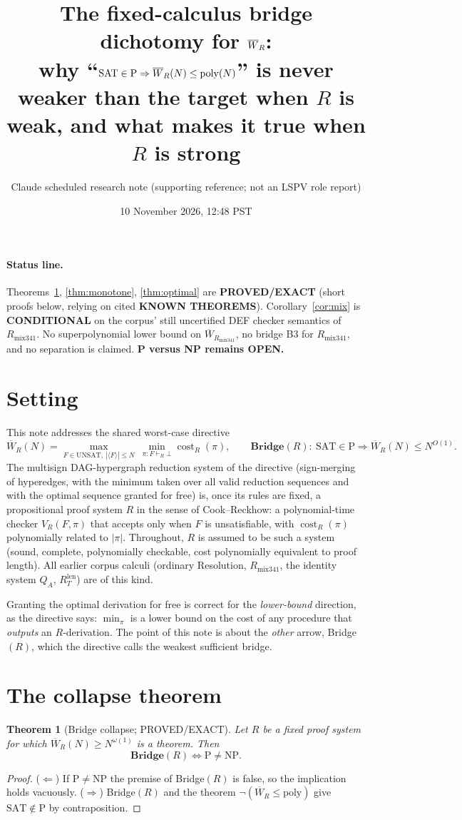 \documentclass[11pt]{article}
\title{The fixed-calculus bridge dichotomy for $\Wbar_R$:\\
why ``$\mathrm{SAT}\in\mathrm P\Rightarrow\Wbar_R(N)\le\mathrm{poly}(N)$'' is never weaker than the target when $R$ is weak, and what makes it true when $R$ is strong}
\author{Claude scheduled research note (supporting reference; not an LSPV role report)}
\date{10 November 2026, 12:48 PST}
\newtheorem{theorem}{Theorem}
\theoremstyle{definition}
\newcommand{\Wbar}{\overline W}
\begin{document}
\maketitle

\paragraph{Status line.} Theorems~\ref{thm:collapse}, \ref{thm:monotone}, \ref{thm:optimal} are \textbf{PROVED/EXACT} (short proofs below, relying on cited \textbf{KNOWN THEOREMS}). Corollary~\ref{cor:mix} is \textbf{CONDITIONAL} on the corpus' still uncertified DEF checker semantics of $R_{\mathrm{mix341}}$. No superpolynomial lower bound on $\Wbar_{R_{\mathrm{mix341}}}$, no bridge B3 for $R_{\mathrm{mix341}}$, and no separation is claimed. \textbf{P versus NP remains OPEN.}

\section{Setting}
This note addresses the shared worst-case directive
\[
\Wbar_R(N)=\max_{F\in\mathrm{UNSAT},\ |\langle F\rangle|\le N}\ \min_{\pi:F\vdash_R\bot}\operatorname{cost}_R(\pi),
\qquad
\textbf{Bridge}(R):\ \mathrm{SAT}\in\mathrm P\Longrightarrow \Wbar_R(N)\le N^{O(1)} .
\]
The multisign DAG-hypergraph reduction system of the directive (sign-merging of hyperedges, with the minimum taken over all valid reduction sequences and with the optimal sequence granted for free) is, once its rules are fixed, a propositional proof system $R$ in the sense of Cook--Reckhow: a polynomial-time checker $V_R(F,\pi)$ that accepts only when $F$ is unsatisfiable, with $\operatorname{cost}_R(\pi)$ polynomially related to $|\pi|$. Throughout, $R$ is assumed to be such a system (sound, complete, polynomially checkable, cost polynomially equivalent to proof length). All earlier corpus calculi (ordinary Resolution, $R_{\mathrm{mix341}}$, the identity system $Q_A$, $R_T^{\mathrm{len}}$) are of this kind.

Granting the optimal derivation for free is correct for the \emph{lower-bound} direction, as the directive says: $\min_\pi$ is a lower bound on the cost of any procedure that \emph{outputs} an $R$-derivation. The point of this note is about the \emph{other} arrow, Bridge$(R)$, which the directive calls the weakest sufficient bridge.

\section{The collapse theorem}
\begin{theorem}[Bridge collapse; PROVED/EXACT]\label{thm:collapse}
Let $R$ be a fixed proof system for which $\Wbar_R(N)\ge N^{\omega(1)}$ is a theorem. Then
\[
\textbf{Bridge}(R)\iff \mathrm{P}\neq\mathrm{NP}.
\]
\end{theorem}
\begin{proof}
($\Leftarrow$) If $\mathrm P\neq\mathrm{NP}$ the premise of Bridge$(R)$ is false, so the implication holds vacuously.
($\Rightarrow$) Bridge$(R)$ and the theorem $\neg(\Wbar_R\le\mathrm{poly})$ give $\mathrm{SAT}\notin\mathrm P$ by contraposition.
\end{proof}
\end{document}
